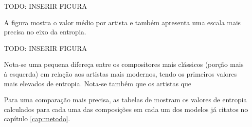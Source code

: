 TODO: INSERIR FIGURA

A figura
mostra o valor médio por artista e também apresenta uma escala mais precisa no eixo da entropia.

TODO: INSERIR FIGURA

Nota-se uma pequena difereça entre os compositores mais clássicos (porção mais à esquerda) em relação aos artistas mais modernos, tendo os primeiros valores mais elevados de entropia. Nota-se também que os artistas que 

Para uma comparação mais precisa, as tabelas de
mostram os valores de entropia calculados para cada uma das composições em cada um dos modelos já citatos no capítulo \ref{cap:metodo}.
% 
